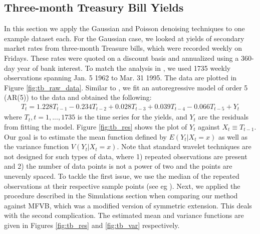 \documentclass[12pt]{article}
\begin{document}
\subsection{Three-month Treasury Bill Yields}
In this section we apply the Gaussian and Poisson denoising techniques to one example dataset each. For the Gaussian case, we looked at yields of secondary market rates from three-month Treasure bills, which were recorded weekly on Fridays. These rates were quoted on a discount basis and annualized using a 360-day year of bank interest. To match the analysis in \cite{Fan1998Efficient}, we used 1735 weekly observations spanning Jan. 5 1962 to Mar. 31 1995. The data are plotted in Figure \ref{fig:tb_raw_data}. Similar to \cite{Fan1998Efficient}, we fit an autoregressive model of order 5 (AR(5)) to the data and obtained the following:
\begin{eqnarray}
T_t=1.228T_{t-1}-0.234T_{t-2}+0.028T_{t-3}+0.039T_{t-4}-0.066T_{t-5}+Y_t
\end{eqnarray}
where $T_t, t=1,...,1735$ is the time series for the yields, and $Y_t$ are the residuals from fitting the model. Figure \ref{fig:tb_res} shows the plot of $Y_t$ against $X_t\equiv T_{t-1}$. Our goal is to estimate the mean function defined by $E(Y_t|X_t=x)$ as well as the variance function $V(Y_t|X_t=x)$. Note that standard wavelet techniques are not designed for such types of data, where 1) repeated observations are present and 2) the number of data points is not a power of two and the points are unevenly spaced. To tackle the first issue, we use the median of the repeated observations at their respective sample points (see eg \cite{Delouille2004Smooth}). Next, we applied the procedure described in the Simulations section when comparing our method against MFVB, which was a modified version of symmetric extension. This deals with the second complication. The estimated mean and variance functions are given in Figures \ref{fig:tb_res} and \ref{fig:tb_var} respectively.
\end{document}
